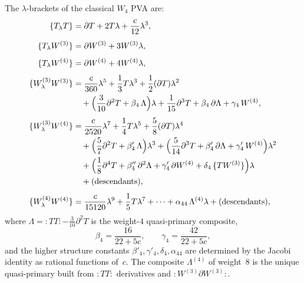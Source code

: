 \begin{definition}
The $\lambda$-brackets of the classical $W_4$ PVA are:
\begin{align}
\{T_\lambda T\}
&=
\partial T + 2T\lambda + \frac{c}{12}\lambda^3,
\\[4pt]
\{T_\lambda W^{(3)}\}
&=
\partial W^{(3)} + 3W^{(3)}\lambda,
\\[4pt]
\{T_\lambda W^{(4)}\}
&=
\partial W^{(4)} + 4W^{(4)}\lambda,
\\[4pt]
\{W^{(3)}_\lambda W^{(3)}\}
&=
\frac{c}{360}\lambda^5
+ \frac{1}{3}T\lambda^3
+ \frac{1}{2}(\partial T)\lambda^2
\notag\\
&\quad
+ \Bigl(\frac{3}{10}\partial^2 T + \beta_4\,\Lambda\Bigr)\lambda
+ \frac{1}{15}\partial^3 T + \beta_4\,\partial\Lambda
+ \gamma_4\,W^{(4)},
\\[4pt]
\{W^{(3)}_\lambda W^{(4)}\}
&=
\frac{c}{2520}\lambda^7
+ \frac{1}{4}T\lambda^5
+ \frac{5}{8}(\partial T)\lambda^4
\notag\\
&\quad
+ \Bigl(\frac{5}{7}\partial^2 T + \beta'_4\,\Lambda\Bigr)\lambda^3
+ \Bigl(\frac{5}{14}\partial^3 T
+ \beta'_4\,\partial\Lambda + \gamma'_4\, W^{(4)}\Bigr)\lambda^2
\notag\\
&\quad
+ \Bigl(\frac{1}{8}\partial^4 T
+ \beta''_4\,\partial^2\Lambda + \gamma'_4\,\partial W^{(4)}
+ \delta_4\,\{TW^{(3)}\}\Bigr)\lambda
\notag\\
&\quad
+ \text{(descendants)},
\\[4pt]
\{W^{(4)}_\lambda W^{(4)}\}
&=
\frac{c}{15120}\lambda^9
+ \frac{1}{5}T\lambda^7 + \cdots
+ \alpha_{44}\,\Lambda^{(4)}\lambda
+ \text{(descendants)},
\end{align}
where $\Lambda = {:}TT{:} - \frac{3}{10}\partial^2 T$ is the weight-$4$
quasi-primary composite,
\begin{equation}%
\beta_4 = \frac{16}{22+5c},
\qquad
\gamma_4 = \frac{42}{22+5c},
\end{equation}
and the higher structure constants $\beta'_4, \gamma'_4, \delta_4, \alpha_{44}$
are determined by the Jacobi identity as rational functions of~$c$.
The composite $\Lambda^{(4)}$ of weight~$8$ is the unique quasi-primary built
from ${:}TT{:}$ derivatives and ${:}W^{(3)}\partial W^{(3)}{:}$.
\end{definition}

